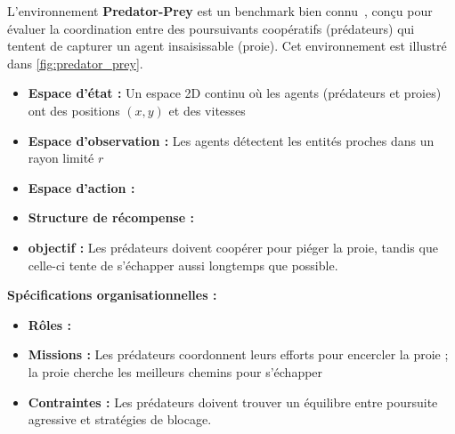 L'environnement \textbf{Predator-Prey} est un benchmark  bien connu~\cite{lowe2017multi}, conçu pour évaluer la coordination entre des poursuivants coopératifs (prédateurs) qui tentent de capturer un agent insaisissable (proie). Cet environnement est illustré dans \autoref{fig:predator_prey}.
%
\begin{itemize}
  \item \textbf{Espace d'état :} Un espace 2D continu où les agents (prédateurs et proies) ont des positions $(x, y)$ et des vitesses
  \item \textbf{Espace d'observation :} Les agents détectent les entités proches dans un rayon limité $r$
  \item \textbf{Espace d'action :}
  \item \textbf{Structure de récompense :}
  \item \textbf{objectif :} Les prédateurs doivent coopérer pour piéger la proie, tandis que celle-ci tente de s'échapper aussi longtemps que possible.
\end{itemize}
%
\textbf{Spécifications organisationnelles :}
\begin{itemize}
  \item \textbf{Rôles :} 
  \item \textbf{Missions :} Les prédateurs coordonnent leurs efforts pour encercler la proie ; la proie cherche les meilleurs chemins pour s'échapper
  \item \textbf{Contraintes :} Les prédateurs doivent trouver un équilibre entre poursuite agressive et stratégies de blocage.
\end{itemize}
